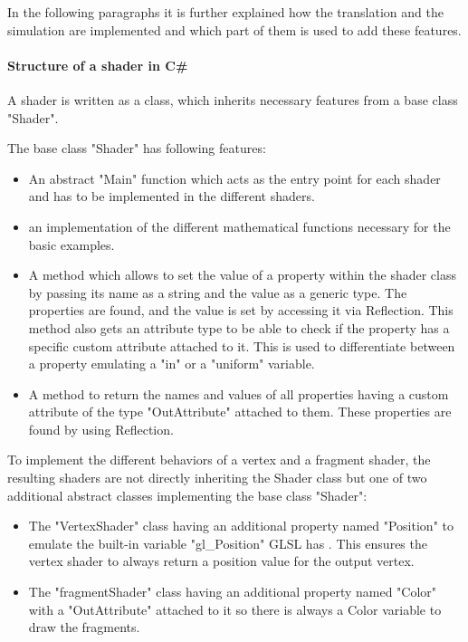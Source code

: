 In the following paragraphs it is further explained how the translation and the simulation are implemented and which part of them is used to add these features.

\paragraph{Structure of a shader in C\#}

A shader is written as a class, which inherits necessary features from a base class "Shader".

The base class "Shader" has following features:
\begin{itemize}
\item An abstract "Main" function which acts as the entry point for each shader and has to be implemented in the different shaders.
\item an implementation of the different mathematical functions necessary for the basic examples.
\item A method which allows to set the value of a property within the shader class by passing its name as a string and the value as a generic type. The properties are found, and the value is set by accessing it via Reflection. This method also gets an attribute type to be able to check if the property has a specific custom attribute attached to it. This is used to differentiate between a property emulating a "in" or a "uniform" variable.
\item A method to return the names and values of all properties having a custom attribute of the type "OutAttribute" attached to them. These properties are found by using Reflection.
\end{itemize}

To implement the different behaviors of a vertex and a fragment shader, the resulting shaders are not directly inheriting the Shader class but one of two additional abstract classes implementing the base class "Shader":
\begin{itemize}
\item The "VertexShader" class having an additional property named "Position" to emulate the built-in variable "gl\_Position" GLSL has . This ensures the vertex shader to always return a position value for the output vertex.
\item The "fragmentShader" class having an additional property named "Color" with a "OutAttribute" attached to it so there is always a Color variable to draw the fragments.
\end{itemize}

